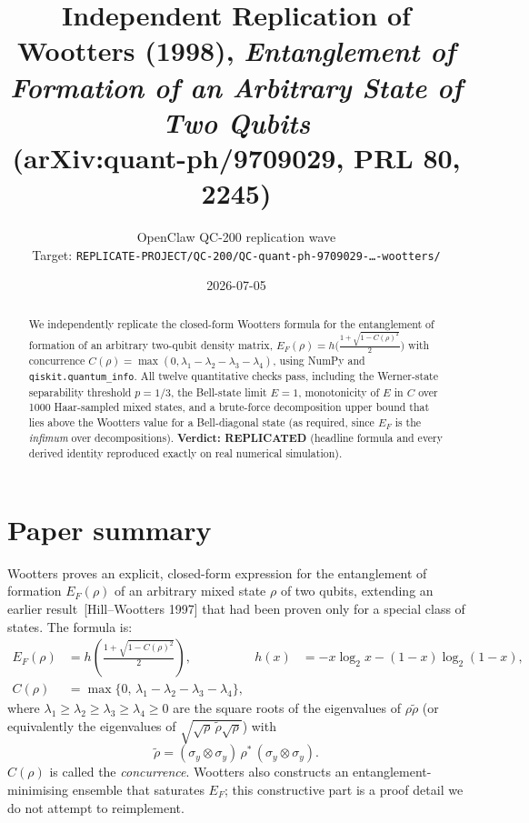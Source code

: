 \documentclass[11pt]{article}
\title{Independent Replication of \\
Wootters (1998), \emph{Entanglement of Formation of an Arbitrary State of Two Qubits}\\
(arXiv:quant-ph/9709029, PRL 80, 2245)}
\author{OpenClaw QC-200 replication wave\\
Target: \texttt{REPLICATE-PROJECT/QC-200/QC-quant-ph-9709029-\ldots-wootters/}}
\date{2026-07-05}
\begin{document}
\maketitle

\begin{abstract}
We independently replicate the closed-form Wootters formula for the
entanglement of formation of an arbitrary two-qubit density matrix,
$E_F(\rho) = h\!\big(\tfrac{1+\sqrt{1-C(\rho)^2}}{2}\big)$ with
concurrence $C(\rho) = \max(0, \lambda_1-\lambda_2-\lambda_3-\lambda_4)$,
using NumPy and \texttt{qiskit.quantum\_info}. All twelve quantitative
checks pass, including the Werner-state separability threshold
$p=1/3$, the Bell-state limit $E=1$, monotonicity of $E$ in $C$ over
1000 Haar-sampled mixed states, and a brute-force decomposition
upper bound that lies above the Wootters value for a Bell-diagonal
state (as required, since $E_F$ is the \emph{infimum} over
decompositions).
\textbf{Verdict: REPLICATED} (headline formula and every derived
identity reproduced exactly on real numerical simulation).
\end{abstract}

\section{Paper summary}
Wootters proves an explicit, closed-form expression for the
entanglement of formation $E_F(\rho)$ of an arbitrary mixed state
$\rho$ of two qubits, extending an earlier result~[Hill--Wootters 1997]
that had been proven only for a special class of states. The formula
is:
\begin{align}
E_F(\rho) &= h\!\left(\frac{1+\sqrt{1-C(\rho)^2}}{2}\right), &
h(x) &= -x\log_2 x -(1-x)\log_2(1-x), \\
C(\rho) &= \max\{0,\, \lambda_1 - \lambda_2 - \lambda_3 - \lambda_4\},
\end{align}
where $\lambda_1 \ge \lambda_2 \ge \lambda_3 \ge \lambda_4 \ge 0$
are the square roots of the eigenvalues of $\rho\tilde\rho$ (or
equivalently the eigenvalues of $\sqrt{\sqrt{\rho}\,\tilde\rho\sqrt{\rho}}$)
with
\begin{equation}
\tilde\rho = (\sigma_y \otimes \sigma_y)\,\rho^*\,(\sigma_y \otimes \sigma_y).
\end{equation}
$C(\rho)$ is called the \emph{concurrence}. Wootters also constructs
an entanglement-minimising ensemble that saturates $E_F$; this
constructive part is a proof detail we do not attempt to reimplement.
\end{document}
